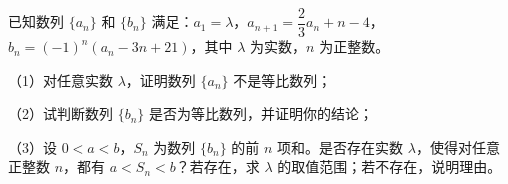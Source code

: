 \begin{question}
已知数列 $\{a_n\}$ 和 $\{b_n\}$ 满足：$a_1=\lambda$，$a_{n+1}=\dfrac23a_n+n-4$，$b_n=(-1)^n(a_n-3n+21)$，其中 $\lambda$ 为实数，$n$ 为正整数。

（1）对任意实数 $\lambda$，证明数列 $\{a_n\}$ 不是等比数列；

（2）试判断数列 $\{b_n\}$ 是否为等比数列，并证明你的结论；

（3）设 $0<a<b$，$S_n$ 为数列 $\{b_n\}$ 的前 $n$ 项和。是否存在实数 $\lambda$，使得对任意正整数 $n$，都有 $a<S_n<b$？若存在，求 $\lambda$ 的取值范围；若不存在，说明理由。

\end{question}